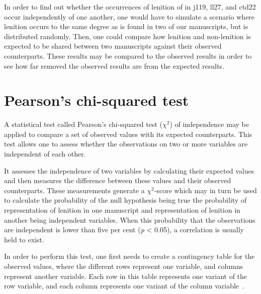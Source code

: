 
In order to find out whether the occurrences of lenition of  in \gls{j119}, \gls{ll27}, and \gls{ctd22} occur independently of one another, one would have to simulate a scenario where lenition occurs to the same degree as is found in two of our manuscripts, but is distributed randomly. Then, one could compare how lenition and non-lenition is expected to be shared between two manuscripts against their observed counterparts. These results may  be compared to the observed results in order to see how far removed the observed results are from the expected results.

\section{Pearson's chi-squared test }
\label{sec:pearsons-chi-squared}

A statistical test called Pearson's chi-squared test (\(\chi^2\)) of independence may be applied to compare a set of observed values with its expected counterparts. This test allows one to assess whether the  observations on two or more variables are independent of each other.

It assesses the independence of two variables by calculating their expected values and then measures the difference between these values and their observed counterparts. These measurements generate a \(\chi^2\)-score which may in turn be used to calculate the probability of the null hypothesis being true \ie the probability of  representation of lenition in one manuscript and representation of lenition in another being independent variables. When this probability that the observations are independent is lower than five per cent (\emph{p} < 0.05), a correlation is usually held to exist.

In order to perform this test, one first needs to create a contingency table for the observed values, where the different rows represent one variable, and columns represent another variable. Each row in this table represents one variant of the row variable, and each column represents one variant of the column variable~\autocite[754]{MS_Statistics09}.

